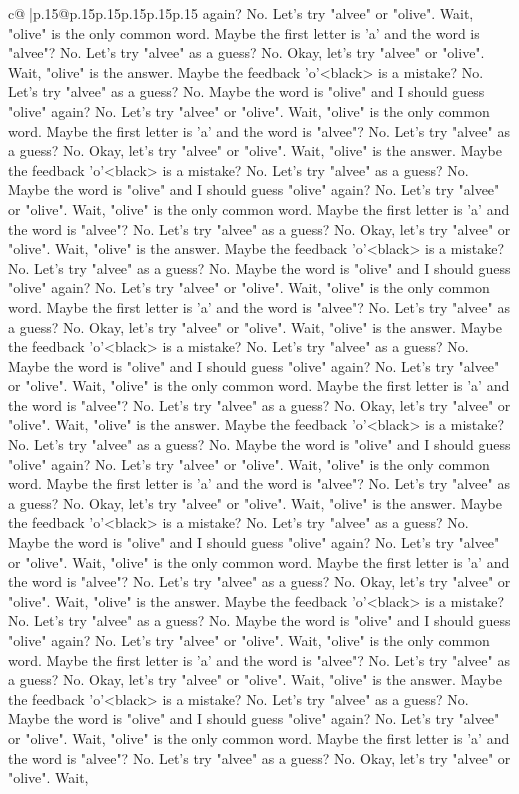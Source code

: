\documentclass{article}
\begin{document}
{\begin{supertabular}{c@{$\;$}|p{.15\linewidth}@{}p{.15\linewidth}p{.15\linewidth}p{.15\linewidth}p{.15\linewidth}p{.15\linewidth}}
{{{again? No. Let's try "alvee" or "olive". Wait, "olive" is the only common word. Maybe the first letter is 'a' and the word is "alvee"? No. Let's try "alvee" as a guess? No. Okay, let's try "alvee" or "olive". Wait, "olive" is the answer. Maybe the feedback 'o'<black> is a mistake? No. Let's try "alvee" as a guess? No. Maybe the word is "olive" and I should guess "olive" again? No. Let's try "alvee" or "olive". Wait, "olive" is the only common word. Maybe the first letter is 'a' and the word is "alvee"? No. Let's try "alvee" as a guess? No. Okay, let's try "alvee" or "olive". Wait, "olive" is the answer. Maybe the feedback 'o'<black> is a mistake? No. Let's try "alvee" as a guess? No. Maybe the word is "olive" and I should guess "olive" again? No. Let's try "alvee" or "olive". Wait, "olive" is the only common word. Maybe the first letter is 'a' and the word is "alvee"? No. Let's try "alvee" as a guess? No. Okay, let's try "alvee" or "olive". Wait, "olive" is the answer. Maybe the feedback 'o'<black> is a mistake? No. Let's try "alvee" as a guess? No. Maybe the word is "olive" and I should guess "olive" again? No. Let's try "alvee" or "olive". Wait, "olive" is the only common word. Maybe the first letter is 'a' and the word is "alvee"? No. Let's try "alvee" as a guess? No. Okay, let's try "alvee" or "olive". Wait, "olive" is the answer. Maybe the feedback 'o'<black> is a mistake? No. Let's try "alvee" as a guess? No. Maybe the word is "olive" and I should guess "olive" again? No. Let's try "alvee" or "olive". Wait, "olive" is the only common word. Maybe the first letter is 'a' and the word is "alvee"? No. Let's try "alvee" as a guess? No. Okay, let's try "alvee" or "olive". Wait, "olive" is the answer. Maybe the feedback 'o'<black> is a mistake? No. Let's try "alvee" as a guess? No. Maybe the word is "olive" and I should guess "olive" again? No. Let's try "alvee" or "olive". Wait, "olive" is the only common word. Maybe the first letter is 'a' and the word is "alvee"? No. Let's try "alvee" as a guess? No. Okay, let's try "alvee" or "olive". Wait, "olive" is the answer. Maybe the feedback 'o'<black> is a mistake? No. Let's try "alvee" as a guess? No. Maybe the word is "olive" and I should guess "olive" again? No. Let's try "alvee" or "olive". Wait, "olive" is the only common word. Maybe the first letter is 'a' and the word is "alvee"? No. Let's try "alvee" as a guess? No. Okay, let's try "alvee" or "olive". Wait, "olive" is the answer. Maybe the feedback 'o'<black> is a mistake? No. Let's try "alvee" as a guess? No. Maybe the word is "olive" and I should guess "olive" again? No. Let's try "alvee" or "olive". Wait, "olive" is the only common word. Maybe the first letter is 'a' and the word is "alvee"? No. Let's try "alvee" as a guess? No. Okay, let's try "alvee" or "olive". Wait, "olive" is the answer. Maybe the feedback 'o'<black> is a mistake? No. Let's try "alvee" as a guess? No. Maybe the word is "olive" and I should guess "olive" again? No. Let's try "alvee" or "olive". Wait, "olive" is the only common word. Maybe the first letter is 'a' and the word is "alvee"? No. Let's try "alvee" as a guess? No. Okay, let's try "alvee" or "olive". Wait, }}}
\end{supertabular}}
\end{document}
